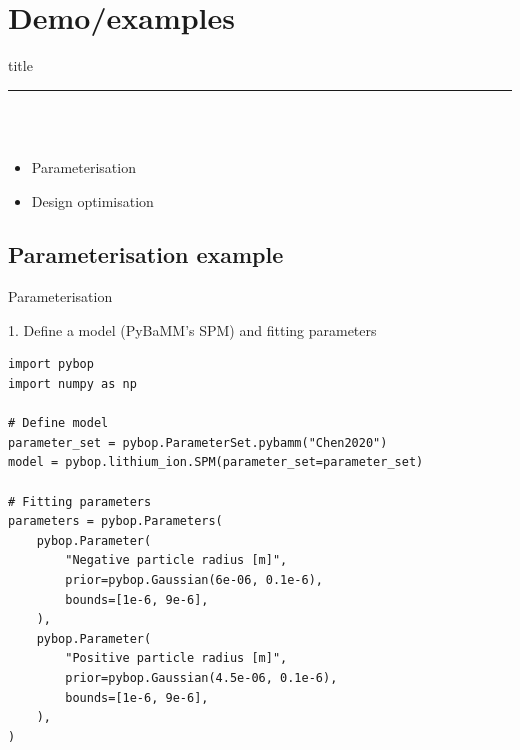 \documentclass[aspectratio=169]{beamer}
\begin{document}
\section{Demo/examples}
\begin{frame}[plain]
    \centering
    \begin{beamercolorbox}[sep=8pt,center,shadow=true,rounded=true]{title}
    \insertsectionhead\par%
    \color{oxfordblue}\noindent\rule{10cm}{1pt} \\
    \LARGE{\faFileCodeO} \\
    \normalsize
    \begin{itemize}
        \item Parameterisation
        \item Design optimisation
    \end{itemize}
    \end{beamercolorbox}
\end{frame}

\subsection{Parameterisation example}
\begin{frame}[fragile,t]{Parameterisation}
    \vspace{-0.5cm}
    \begin{block}{1. Define a model (PyBaMM's SPM) and fitting parameters}
    \begin{lstlisting}[firstnumber=1, xleftmargin=10pt]
import pybop
import numpy as np

# Define model
parameter_set = pybop.ParameterSet.pybamm("Chen2020")
model = pybop.lithium_ion.SPM(parameter_set=parameter_set)

# Fitting parameters
parameters = pybop.Parameters(
    pybop.Parameter(
        "Negative particle radius [m]",
        prior=pybop.Gaussian(6e-06, 0.1e-6),
        bounds=[1e-6, 9e-6],
    ),
    pybop.Parameter(
        "Positive particle radius [m]",
        prior=pybop.Gaussian(4.5e-06, 0.1e-6),
        bounds=[1e-6, 9e-6],
    ),
)
    \end{lstlisting}
    \end{block}
\end{frame}
\end{document}
